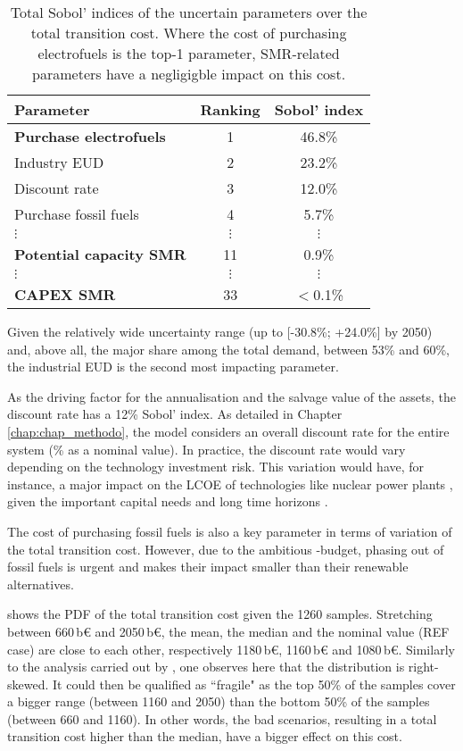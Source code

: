 \begin{table}[htbp!]
\caption{Total Sobol' indices of the uncertain parameters over the total transition cost. Where the cost of purchasing electrofuels is the top-1 parameter, \gls{SMR}-related parameters have a negligigble impact on this cost.}
\label{tab:UQ_short}
\centering
\begin{tabular}{l c c}
\toprule
\textbf{Parameter}  & \textbf{Ranking} & \textbf{Sobol' index} \\	
\midrule
\textbf{Purchase electrofuels} & 1 & 46.8\% \\
Industry EUD & 2 & 23.2\% \\
Discount rate & 3 & 12.0\% \\
Purchase fossil fuels  & 4 & 5.7\% \\
$\vdots$ & $\vdots$ & $\vdots$\\
\textbf{Potential capacity \gls{SMR}} & 11 & 0.9\% \\
$\vdots$ & $\vdots$ & $\vdots$\\
\textbf{CAPEX \gls{SMR}} & 33 & $<$0.1\% \\
\bottomrule							

\end{tabular}
\end{table}

Given the relatively wide uncertainty range (\ie up to [-30.8\%; +24.0\%] by 2050) and, above all, the major share among the total demand, between 53\% and 60\%, the industrial \gls{EUD} is the second most impacting parameter. 

As the driving factor for the annualisation and the salvage value of the assets, the discount rate has a 12\% Sobol' index. As detailed in Chapter \ref{chap:chap_methodo}, the model considers an overall discount rate for the entire system (\% as a nominal value). In practice, the discount rate would vary depending on the technology investment risk. This variation would have, for instance, a major impact on the \gls{LCOE} of technologies like nuclear power plants \cite{world_nuclear_asso}, given the important capital needs and long time horizons \cite{IEA_Nuclear_2022}.

The cost of purchasing fossil fuels is also a key parameter in terms of variation of the total transition cost. However, due to the ambitious -budget, phasing out of fossil fuels is urgent and makes their impact smaller than their renewable alternatives.

 shows the \gls{PDF} of the total transition cost given the 1260 samples. Stretching between 660\,b€ and 2050\,b€, the mean, the median and the nominal value (\ie REF case) are close to each other, respectively 1180\,b€, 1160\,b€ and 1080\,b€. Similarly to the analysis carried out by \citet{coppitters2023optimizing}, one observes here that the distribution is right-skewed. It could then be qualified as ``fragile" as the top 50\% of the samples cover a bigger range (\ie between 1160 and 2050) than the bottom 50\% of the samples (\ie between 660 and 1160). In other words, the bad scenarios, resulting in a total transition cost higher than the median, have a bigger effect on this cost.


